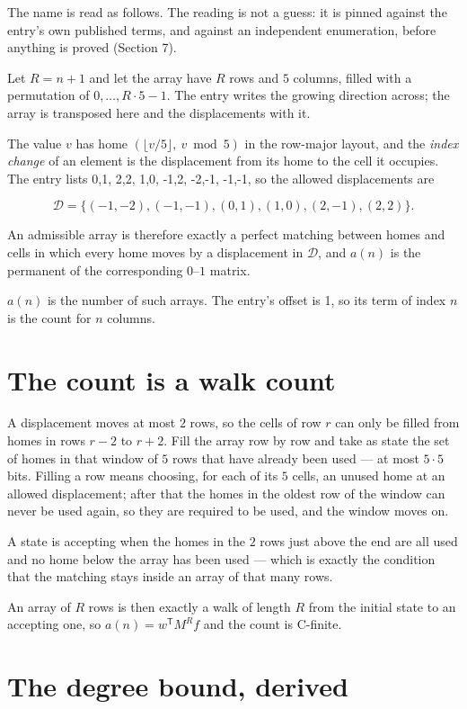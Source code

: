 \documentclass[11pt]{article}
\theoremstyle{definition}
\begin{document}
The name is read as follows. The reading is not a guess: it is pinned against the entry's own published terms, and against an independent enumeration, before anything is proved (Section 7).

Let $R = n + 1$ and let the array have $R$ rows and $5$ columns, filled with a permutation of $0,\dots,R\cdot5-1$. The entry writes the growing direction across; the array is transposed here and the displacements with it.

The value $v$ has home $(\lfloor v/5\rfloor,\ v \bmod 5)$ in the row-major layout, and the {\itshape index change} of an element is the displacement from its home to the cell it occupies. The entry lists 0,1, 2,2, 1,0, -1,2, -2,-1, -1,-1, so the allowed displacements are

\[\mathcal{D} = \{(-1,-2), (-1,-1), (0,1), (1,0), (2,-1), (2,2)\}.\]

An admissible array is therefore exactly a perfect matching between homes and cells in which every home moves by a displacement in $\mathcal{D}$, and $a(n)$ is the permanent of the corresponding $0$--$1$ matrix.

$a(n)$ is the number of such arrays. The entry's offset is 1, so its term of index $n$ is the count for $n$ columns.

\section{The count is a walk count}

A displacement moves at most $2$ rows, so the cells of row $r$ can only be filled from homes in rows $r-2$ to $r+2$. Fill the array row by row and take as state the set of homes in that window of $5$ rows that have already been used --- at most $5\cdot5$ bits. Filling a row means choosing, for each of its $5$ cells, an unused home at an allowed displacement; after that the homes in the oldest row of the window can never be used again, so they are required to be used, and the window moves on.

A state is accepting when the homes in the $2$ rows just above the end are all used and no home below the array has been used --- which is exactly the condition that the matching stays inside an array of that many rows.

An array of $R$ rows is then exactly a walk of length $R$ from the initial state to an accepting one, so $a(n) = w^{\mathsf T}M^{R}f$ and the count is C-finite.

\section{The degree bound, derived}
\end{document}

